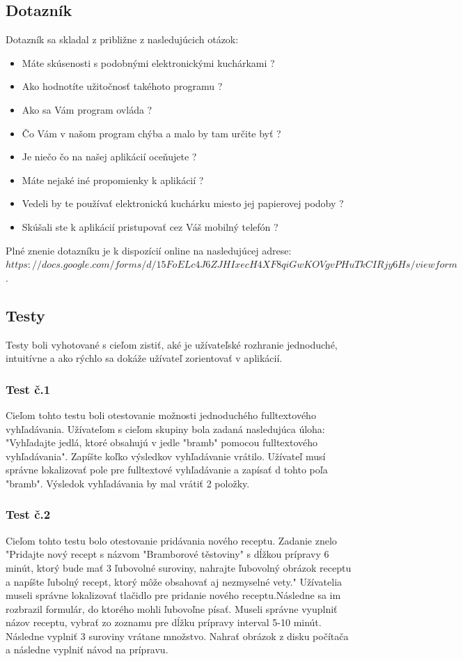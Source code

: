 \documentclass[12pt,a4paper,titlepage,final]{article}
\begin{document}
\subsection{Dotazník}
Dotazník sa skladal z približne z nasledujúcich otázok:
\begin{itemize}
\item Máte skúsenosti s podobnými elektronickými kuchárkami ?
\item Ako hodnotíte užitočnosť takéhoto programu ?
\item Ako sa Vám program ovláda ?
\item Čo Vám v našom program chýba a malo by tam určite byť ?
\item Je niečo čo na našej aplikácií oceňujete ?
\item Máte nejaké iné propomienky k aplikácií ?
\item Vedeli by te používať elektronickú kuchárku miesto jej papierovej podoby ?
\item Skúšali ste k aplikácií pristupovať cez Váš mobilný telefón ?


\end{itemize}
Plné znenie dotazníku je k dispozícií online na nasledujúcej adrese:$https://docs.google.com/forms/d/15FoELc4J6ZJHIxecH4XF8qiGwKOVgvPHuTkCIRjy6Hs/viewform$. 

\subsection{Testy}
Testy boli vyhotované s cieľom zistiť, aké je užívateľské rozhranie jednoduché, intuitívne a ako rýchlo sa dokáže užívateľ zorientovať v aplikácií. 

\subsubsection{Test č.1}
Cieľom tohto testu boli otestovanie možnosti jednoduchého fulltextového vyhľadávania. Užívateľom s cieľom skupiny bola zadaná nasledujúca úloha: "Vyhľadajte jedlá, ktoré obsahujú v jedle "bramb" pomocou fulltextového vyhľadávania". Zapíšte koľko výsledkov vyhľadávanie vrátilo. Užívateľ musí správne lokalizovať pole pre fulltextové vyhľadávanie a zapísať d tohto poľa "bramb". Výsledok vyhľadávania by mal vrátiť 2 položky.

\subsubsection{Test č.2}
Cieľom tohto testu bolo otestovanie pridávania nového receptu. Zadanie znelo "Pridajte nový recept s názvom "Bramborové těstoviny" s dĺžkou prípravy 6 minút, ktorý bude mať 3 ľubovolné suroviny, nahrajte ľubovolný obrázok receptu a napíšte ľubolný recept, ktorý môže obsahovať aj nezmyselné vety." Užívatelia museli správne lokalizovať tlačidlo pre pridanie nového receptu.Následne sa im rozbrazil formulár, do ktorého mohli ľubovoľne písať. Museli správne vyuplniť názov receptu, vybrať zo zoznamu pre dĺžku prípravy interval 5-10 minút. Následne vyplniť 3 suroviny vrátane množstvo. Nahrať obrázok z disku počítača a následne vyplniť návod na prípravu.
\end{document}
